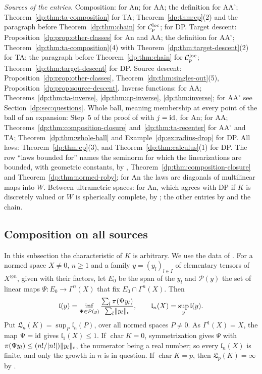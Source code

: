 \emph{Sources of the entries.} Composition: \cite[Proposition~14.26, proof, Step~1]{I} for An; \cite[Theorem~14.17]{I} for AA; the definition for $\mathrm{AA}^\circ$; Theorem~\ref{dp:thm:ta-composition} for TA; Theorem~\ref{dp:thm:cp}(2) and the paragraph before Theorem~\ref{dp:thm:chain} for $\mathcal{C}_p^{\rm loc}$; \cite[Lemma~Q.3]{I} for DP. Target descent: Proposition~\ref{dp:prop:other-classes} for An and AA; the definition for $\mathrm{AA}^\circ$; Theorem~\ref{dp:thm:ta-composition}(4) with Theorem~\ref{dp:thm:target-descent}(2) for TA; the paragraph before Theorem~\ref{dp:thm:chain} for $\mathcal{C}_p^{\rm loc}$; Theorem~\ref{dp:thm:target-descent} for DP. Source descent: Proposition~\ref{dp:prop:other-classes}, Theorem~\ref{dp:thm:singles-out}(5), Proposition~\ref{dp:prop:source-descent}. Inverse functions: \cite[Corollary~14.19(1)]{I} for AA; Theorems~\ref{dp:thm:ta-inverse}, \ref{dp:thm:cp-inverse}, \ref{dp:thm:inverse}; for $\mathrm{AA}^\circ$ see Section~\ref{dp:sec:questions}. Whole ball, meaning membership at every point of the ball of an expansion: Step~5 of the proof of \cite[Proposition~14.12]{I} with $j=\mathrm{id}$, for An; \cite[Proposition~14.12(2)]{I} for AA; Theorems~\ref{dp:thm:composition-closure} and~\ref{dp:thm:ta-recenter} for $\mathrm{AA}^\circ$ and TA; Theorem~\ref{dp:thm:whole-ball} and Example~\ref{dp:ex:radius-drop} for DP. All laws: Theorem~\ref{dp:thm:cp}(3), and Theorem~\ref{dp:thm:calculus}(1) for DP. The row ``laws bounded for'' names the seminorm for which the linearizations are bounded, with geometric constants, by \cite[Proposition~14.9(1)]{I}, Theorem~\ref{dp:thm:composition-closure} and Theorem~\ref{dp:thm:normed-roby}; for An the laws are diagonals of multilinear maps into $W$. Between ultrametric spaces: \cite[Proposition~14.40(3)]{I} for An, which agrees with DP if $K$ is discretely valued or $W$ is spherically complete, by \cite[Proposition~14.40(1)]{I}; the other entries by \cite[Theorem~14.39(1)]{I} and the chain.

\subsection{Composition on all sources}\label{dp:ssec:all-sources}

In this subsection the characteristic of $K$ is arbitrary. We use the data of \cite[Definition~14.15]{I}. For a normed space $X\ne0$, $n\ge1$ and a family $y=(y_l)_{l\in I}$ of elementary tensors of $X^{\otimes n}$, given with their factors, let $E_0$ be the span of the $y_l$ and $\mathcal P(y)$ the set of linear maps $\Psi\colon E_0\to\Gamma^n(X)$ that fix $E_0\cap\Gamma^n(X)$. Then
\[
 \mathfrak l(y)=\inf_{\Psi\in\mathcal P(y)}\frac{\sum_l\pi(\Psi y_l)}{\sum_l\lVert y_l\rVert_{\rm e}},\qquad\mathfrak l_n(X)=\sup_y\mathfrak l(y).
\]
Put $\mathfrak L_n(K)=\sup_P\mathfrak l_n(P)$, over all normed spaces $P\ne0$. As $\Gamma^1(X)=X$, the map $\Psi=\mathrm{id}$ gives $\mathfrak l_1(X)\le1$. If $\operatorname{char}K=0$, symmetrization gives $\Psi$ with $\pi(\Psi y_l)\le(n!/\lvert n!\rvert)\lVert y_l\rVert_{\rm e}$, the numerator being a real number; so every $\mathfrak l_n(X)$ is finite, and only the growth in $n$ is in question. If $\operatorname{char}K=p$, then $\mathfrak L_p(K)=\infty$ by \cite[Lemma~Q.9]{I}.


